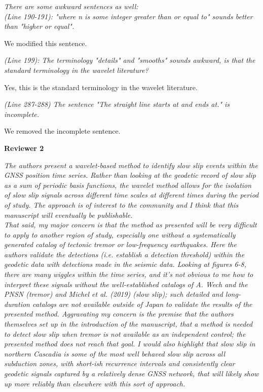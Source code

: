 \documentclass[letterpaper, 12pt]{article}
\begin{document}
\bigskip

\textit{There are some awkward sentences as well:} \\

\textit{ (Line 190-191): "where n is some integer greater than or equal to" sounds better than "higher or equal".}

\bigskip

We modified this sentence.

\bigskip

\textit{(Line 199): The terminology "details" and "smooths" sounds awkward, is that the standard terminology in the wavelet literature?}

\bigskip

Yes, this is the standard terminology in the wavelet literature.

\bigskip

\textit{(Line 287-288) The sentence "The straight line starts at and ends at." is incomplete.}

\bigskip

We removed the incomplete sentence.

\bigskip

\textbf{Reviewer 2}

\bigskip

\textit{The authors present a wavelet-based method to identify slow slip events within the GNSS position time series. Rather than looking at the geodetic record of slow slip as a sum of periodic basis functions, the wavelet method allows for the isolation of slow slip signals across different time scales at different times during the period of study. The approach is of interest to the community and I think that this manuscript will eventually be publishable.} \\

\textit{That said, my major concern is that the method as presented will be very difficult to apply to another region of study, especially one without a systematically generated catalog of tectonic tremor or low-frequency earthquakes. Here the authors validate the detections (i.e. establish a detection threshold) within the geodetic data with detections made in the seismic data. Looking at figures 6-8, there are many wiggles within the time series, and it's not obvious to me how to interpret these signals without the well-established catalogs of A. Wech and the PNSN (tremor) and Michel et al. (2019) (slow slip); such detailed and long-duration catalogs are not available outside of Japan to validate the results of the presented method. Aggravating my concern is the premise that the authors themselves set up in the introduction of the manuscript, that a method is needed to detect slow slip when tremor is not available as an independent control; the presented method does not reach that goal. I would also highlight that slow slip in northern Cascadia is some of the most well behaved slow slip across all subduction zones, with short-ish recurrence intervals and consistently clear geodetic signals captured by a relatively dense GNSS network, that will likely show up more reliably than elsewhere with this sort of approach.}
\end{document}
